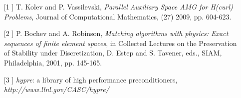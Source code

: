 \documentclass{report}
\begin{document}
\begin{itemize}

\item[[1]]
{\sc T. Kolev and P. Vassilevski},
{\it Parallel Auxiliary Space AMG for H(curl) Problems}, Journal of
Computational Mathematics, (27) 2009, pp. 604-623.

\item[[2]]
{\sc P. Bochev and A. Robinson},
{\it Matching algorithms with physics: Exact sequences of finite element spaces}, in
Collected Lectures on the Preservation of Stability under Discretization,
D. Estep and S. Tavener, eds., SIAM, Philadelphia, 2001, pp. 145-165.

\item[[3]]
{\em hypre}: a library of high performance preconditioners, {\it
http://www.llnl.gov/CASC/hypre/}

\end{itemize}
\end{document}
